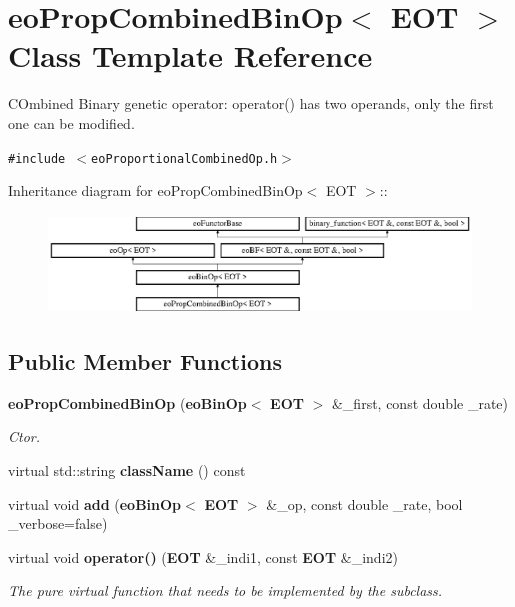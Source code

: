 \section{eo\-Prop\-Combined\-Bin\-Op$<$ EOT $>$ Class Template Reference}
\label{classeo_prop_combined_bin_op}
COmbined Binary genetic operator: operator() has two operands, only the first one can be modified.  


{\tt \#include $<$eo\-Proportional\-Combined\-Op.h$>$}

Inheritance diagram for eo\-Prop\-Combined\-Bin\-Op$<$ EOT $>$::\begin{figure}[H]
\begin{center}
\leavevmode
\includegraphics[height=2.60163cm]{classeo_prop_combined_bin_op}
\end{center}
\end{figure}
\subsection*{Public Member Functions}
\begin{CompactItemize}
\item 
{\bf eo\-Prop\-Combined\-Bin\-Op} ({\bf eo\-Bin\-Op}$<$ {\bf EOT} $>$ \&\_\-first, const double \_\-rate)\label{classeo_prop_combined_bin_op_a0}

\begin{CompactList}\small\item\em Ctor. \item\end{CompactList}\item 
virtual std::string {\bf class\-Name} () const \label{classeo_prop_combined_bin_op_a1}

\item 
virtual void {\bf add} ({\bf eo\-Bin\-Op}$<$ {\bf EOT} $>$ \&\_\-op, const double \_\-rate, bool \_\-verbose=false)\label{classeo_prop_combined_bin_op_a2}

\item 
virtual void {\bf operator()} ({\bf EOT} \&\_\-indi1, const {\bf EOT} \&\_\-indi2)\label{classeo_prop_combined_bin_op_a3}

\begin{CompactList}\small\item\em The pure virtual function that needs to be implemented by the subclass. \item\end{CompactList}\end{CompactItemize}
